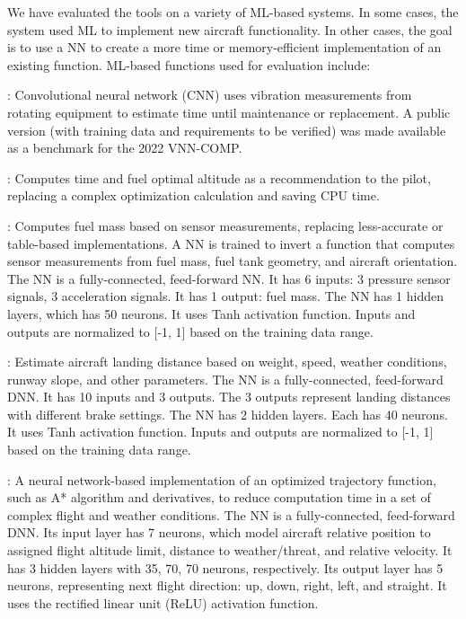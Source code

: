 We have evaluated the tools on a variety of ML-based systems.  In some cases, the system used ML to implement new aircraft functionality.  In other cases, the goal is to use a NN to create a more time or memory-efficient implementation of an existing function.  ML-based functions used for evaluation include:

:  Convolutional neural network (CNN) uses vibration measurements from rotating equipment to estimate time until maintenance or replacement.  A public version (with training data and requirements to be verified) was made available as a benchmark for the 2022 VNN-COMP.


:  Computes time and fuel optimal altitude as a recommendation to the pilot, replacing a complex optimization calculation and saving CPU time.    

:  Computes fuel mass based on sensor measurements, replacing less-accurate or table-based implementations.  A NN is trained to invert a function that computes sensor measurements from fuel mass, fuel tank geometry, and aircraft orientation.  The NN is a fully-connected, feed-forward NN. It has 6 inputs: 3 pressure sensor signals, 3 acceleration signals. It has 1 output: fuel mass. The NN has 1 hidden layers, which has 50 neurons. It uses Tanh activation function. Inputs and outputs are normalized to [-1, 1] based on the training data range.


:  Estimate aircraft landing distance based on weight, speed, weather conditions, runway slope, and other parameters.  The NN is a fully-connected, feed-forward DNN. It has 10 inputs and 3 outputs. The 3 outputs represent landing distances with different brake settings. The NN has 2 hidden layers. Each has 40 neurons. It uses Tanh activation function. Inputs and outputs are normalized to [-1, 1] based on the training data range.


: A neural network-based implementation of an optimized trajectory function, such as A* algorithm and derivatives, to reduce computation time in a set of complex flight and weather conditions. The NN is a fully-connected, feed-forward DNN. Its input layer has 7 neurons, which model aircraft relative position to assigned flight altitude limit, distance to weather/threat, and relative velocity. It has 3 hidden layers with 35, 70, 70 neurons, respectively. Its output layer has 5 neurons, representing next flight direction: up, down, right, left, and straight. It uses the rectified linear unit (ReLU) activation function. 


